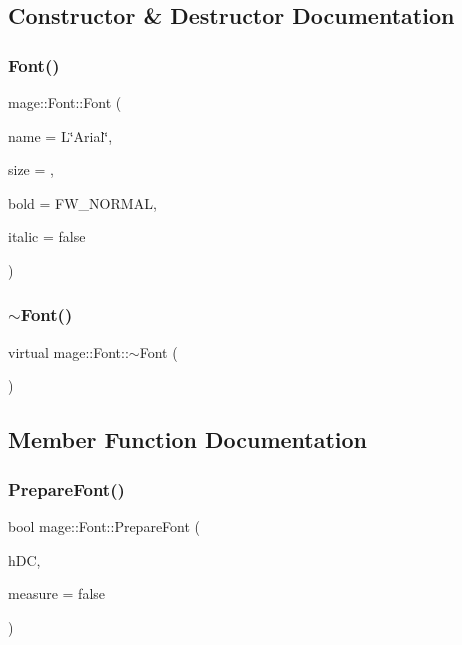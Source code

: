 \subsection{Constructor \& Destructor Documentation}
\hypertarget{classmage_1_1_font_a10cc7123d8afdea0d092467b44dc7b66}{}\label{classmage_1_1_font_a10cc7123d8afdea0d092467b44dc7b66} 
\subsubsection{\texorpdfstring{Font()}{Font()}}
{\footnotesize\ttfamily mage\+::\+Font\+::\+Font (\begin{DoxyParamCaption}\item[{const wstring \&}]{name = {\ttfamily L\char`\"{}Arial\char`\"{}},  }\item[{uint16\+\_\+t}]{size = {},  }\item[{uint32\+\_\+t}]{bold = {\ttfamily FW\+\_\+NORMAL},  }\item[{bool}]{italic = {\ttfamily false} }\end{DoxyParamCaption})}

\hypertarget{classmage_1_1_font_a4d984764d0393dc835d98888f98dd02d}{}\label{classmage_1_1_font_a4d984764d0393dc835d98888f98dd02d} 
\subsubsection{\texorpdfstring{$\sim$\+Font()}{~Font()}}
{\footnotesize\ttfamily virtual mage\+::\+Font\+::$\sim$\+Font (\begin{DoxyParamCaption}{ }\end{DoxyParamCaption})\hspace{0.3cm}{\ttfamily [virtual]}}



\subsection{Member Function Documentation}
\hypertarget{classmage_1_1_font_a4cbf910a292f2957b43fd4060db6aba4}{}\label{classmage_1_1_font_a4cbf910a292f2957b43fd4060db6aba4} 
\subsubsection{\texorpdfstring{Prepare\+Font()}{PrepareFont()}}
{\footnotesize\ttfamily bool mage\+::\+Font\+::\+Prepare\+Font (\begin{DoxyParamCaption}\item[{H\+DC}]{h\+DC,  }\item[{bool}]{measure = {\ttfamily false} }\end{DoxyParamCaption})\hspace{0.3cm}{\ttfamily [private]}}

